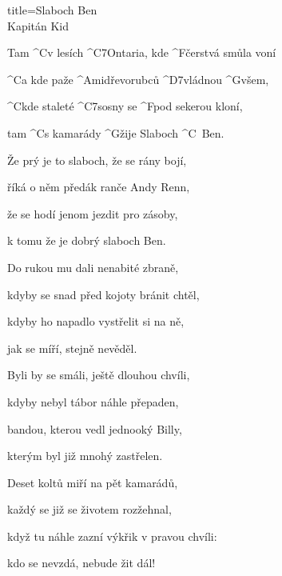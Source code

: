 \begin{song}{title=\predtitle\centering Slaboch Ben \\\large Kapitán Kid  \vspace*{-0.3cm}}  %
\begin{centerjustified}

\sloka
	Tam ^{C}v lesích ^{{\z}C7}Ontaria, kde ^{F\z}čerstvá smůla voní

	^{C}a kde paže ^{Ami\z}dřevorubců ^{D7\z}vládnou ^{G\z}všem,
	
	^{C\z}kde staleté ^{C7\z}sosny se ^{F\z}pod sekerou kloní,
	
	tam ^{C}s kamarády ^{G\z}žije Slaboch ^{C\,\,\,}Ben.
	
	
\sloka
	Že prý je to slaboch, že se rány bojí,
	
	říká o něm předák ranče Andy Renn,
	
	že se hodí jenom jezdit pro zásoby,
	
	k tomu že je dobrý slaboch Ben.
	
	
\sloka
	Do rukou mu dali nenabité zbraně,
	
	kdyby se snad před kojoty bránit chtěl,
	
	kdyby ho napadlo vystřelit si na ně,
	
	jak se míří, stejně nevěděl.

	
\sloka	
	Byli by se smáli, ještě dlouhou chvíli,
	
	kdyby nebyl tábor náhle přepaden,
	
	bandou, kterou vedl jednooký Billy,
	
	kterým byl již mnohý zastřelen.
	
	

	


\sloka
	Deset koltů miří na pět kamarádů,
	
	každý se již se životem rozžehnal,
	
	když tu náhle zazní výkřik v pravou chvíli:
	
	kdo se nevzdá, nebude žit dál!
	

\end{centerjustified}
\end{song}

